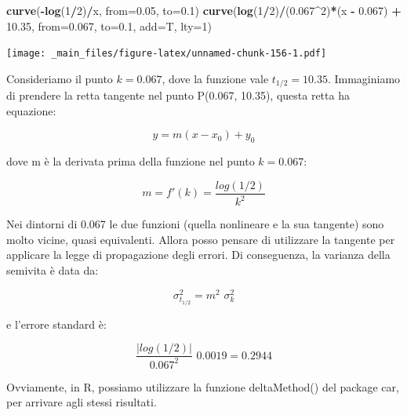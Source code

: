 \documentclass[a4paper,12pt,oneside]{book}
\newenvironment{Shaded}{\begin{snugshade}}{\end{snugshade}}
\newcommand{\KeywordTok}[1]{\textcolor[rgb]{0.13,0.29,0.53}{\textbf{#1}}}
\newcommand{\DataTypeTok}[1]{\textcolor[rgb]{0.13,0.29,0.53}{#1}}
\newcommand{\DecValTok}[1]{\textcolor[rgb]{0.00,0.00,0.81}{#1}}
\newcommand{\FloatTok}[1]{\textcolor[rgb]{0.00,0.00,0.81}{#1}}
\newcommand{\StringTok}[1]{\textcolor[rgb]{0.31,0.60,0.02}{#1}}
\newcommand{\OperatorTok}[1]{\textcolor[rgb]{0.81,0.36,0.00}{\textbf{#1}}}
\newcommand{\NormalTok}[1]{#1}
\theoremstyle{definition}
\theoremstyle{definition}
\theoremstyle{definition}
\theoremstyle{remark}
\begin{document}
\begin{Shaded}
\begin{Highlighting}[]
\KeywordTok{curve}\NormalTok{(}\OperatorTok{-}\KeywordTok{log}\NormalTok{(}\DecValTok{1}\OperatorTok{/}\DecValTok{2}\NormalTok{)}\OperatorTok{/}\NormalTok{x, }\DataTypeTok{from=}\FloatTok{0.05}\NormalTok{, }\DataTypeTok{to=}\FloatTok{0.1}\NormalTok{)}
\KeywordTok{curve}\NormalTok{(}\KeywordTok{log}\NormalTok{(}\DecValTok{1}\OperatorTok{/}\DecValTok{2}\NormalTok{)}\OperatorTok{/}\NormalTok{(}\FloatTok{0.067}\OperatorTok{^}\DecValTok{2}\NormalTok{)}\OperatorTok{*}\NormalTok{(x }\OperatorTok{-}\StringTok{ }\FloatTok{0.067}\NormalTok{) }\OperatorTok{+}\StringTok{ }
\StringTok{        }\FloatTok{10.35}\NormalTok{, }\DataTypeTok{from=}\FloatTok{0.067}\NormalTok{, }\DataTypeTok{to=}\FloatTok{0.1}\NormalTok{, }\DataTypeTok{add=}\NormalTok{T, }\DataTypeTok{lty=}\DecValTok{1}\NormalTok{)}
\end{Highlighting}
\end{Shaded}

\texttt{[image: \_main\_files/figure-latex/unnamed-chunk-156-1.pdf]}

Consideriamo il punto \(k = 0.067\), dove la funzione vale
\(t_{1/2} = 10.35\). Immaginiamo di prendere la retta tangente nel punto
P(0.067, 10.35), questa retta ha equazione:

\[ y = m (x - x_0) + y_0 \]

dove m è la derivata prima della funzione nel punto \(k=0.067\):

\[ m = f'(k) = \frac{log(1/2)}{k^2}\]

Nei dintorni di 0.067 le due funzioni (quella nonlineare e la sua
tangente) sono molto vicine, quasi equivalenti. Allora posso pensare di
utilizzare la tangente per applicare la legge di propagazione degli
errori. Di conseguenza, la varianza della semivita è data da:

\[\sigma^2_{t_{1/2}} = m^2 \,\, \sigma^2_k\]

e l'errore standard è:

\[\frac{|log(1/2)|}{0.067^2} \,\, 0.0019 = 0.2944\]

Ovviamente, in R, possiamo utilizzare la funzione deltaMethod() del
package car, per arrivare agli stessi risultati.

\begin{Shaded}
\end{Shaded}
\end{document}
